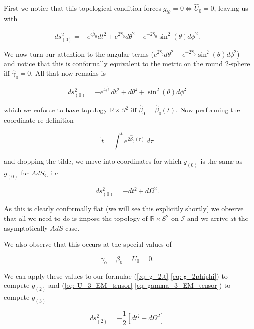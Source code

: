 \documentclass[a4paper,11pt]{article}
\numberwithin{equation}{section}
\begin{document}
First we notice that this topological condition forces $g_{t \theta}=0 \iff \hat{U}_0=0$, leaving us with 

\begin{equation}
ds_{(0)}^2=-e^{4\hat{\beta}_{0}}dt^2+e^{2\hat{\gamma}_{0}}d\theta^2+e^{-2\hat{\gamma}_{0}}\sin^2(\theta)d\phi^2.
\end{equation}

\noindent We now turn our attention to the angular terms ($e^{2\hat{\gamma}_{0}}d\theta^2+e^{-2\hat{\gamma}_{0}}\sin^2(\theta)d\phi^2$) and notice that this is conformally equivalent to the metric on the round 2-sphere iff $\hat{\gamma}_{0}=0$. All that now remains is 

\begin{equation}
ds_{(0)}^2=-e^{4\hat{\beta}_{0}}dt^2+d\theta^2+\sin^2(\theta)d\phi^2
\end{equation}

\noindent which we enforce to have topology $\mathbb{R} \times S^2$ iff $\hat{\beta}_0=\hat{\beta}_0(t)$. Now performing the coordinate re-definition

\begin{equation}
\tilde{t}=\int^{t} e^{2\hat{\beta}_0(\tau)} \, d\tau
\end{equation}

\noindent and dropping the tilde, we move into coordinates for which $g_{(0)}$ is the same as $g_{(0)}$ for $AdS_4$, i.e. 

\begin{equation}
ds_{(0)}^2=-dt^2+d\Omega^2.
\end{equation}

As this is clearly conformally flat (we will see this explicitly shortly) we observe that all we need to do is impose the topology of $\mathbb{R} \times S^2$ on  $\mathscr{I}$ and we arrive at the asymptotically $AdS$ case. \par

We also observe that this occurs at the special values of 

\begin{equation}
\gamma_{0}=\beta_{0}=U_{0}=0.
\end{equation}

We can apply these values to our formulae (\ref{eq: g_2tt}-\ref{eq: g_2phiphi}) to compute $g_{(2)}$ and (\ref{eq: U_3_EM_tensor}-\ref{eq: gamma_3_EM_tensor}) to compute $g_{(3)}$

\begin{equation}
ds_{(2)}^{2}=-\frac{1}{2}[dt^2+d\Omega^2]
\end{equation}
\end{document}
